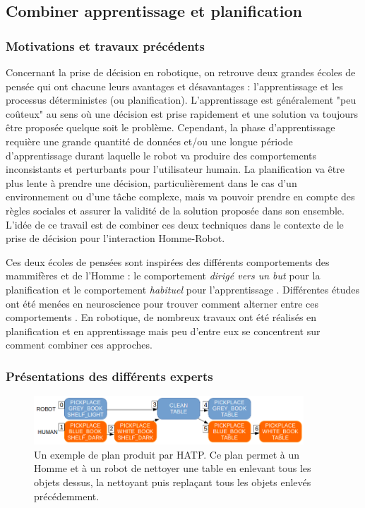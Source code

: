 \documentclass[english,a4paper,11pt,twoside]{StyleThese}
\begin{document}
\newpage
\subsection{Combiner apprentissage et planification}

\subsubsection{Motivations et travaux précédents}

Concernant la prise de décision en robotique, on retrouve deux grandes écoles de pensée qui ont chacune leurs avantages et désavantages : l'apprentissage et les processus déterministes (ou planification). L'apprentissage est généralement "peu coûteux" au sens où une décision est prise rapidement et une solution va toujours être proposée quelque soit le problème. Cependant, la phase d'apprentissage requière une grande quantité de données et/ou une longue période d'apprentissage durant laquelle le robot va produire des comportements inconsistants et perturbants pour l'utilisateur humain. La planification va être plus lente à prendre une décision, particulièrement dans le cas d'un environnement ou d'une tâche complexe, mais va pouvoir prendre en compte des règles sociales et assurer la validité de la solution proposée dans son ensemble. L'idée de ce travail est de combiner ces deux techniques dans le contexte de le prise de décision pour l’interaction Homme-Robot.

Ces deux écoles de pensées sont inspirées des différents comportements des mammifères et de l'Homme : le comportement \textit{dirigé vers un but} pour la planification et le comportement \textit{habituel} pour l'apprentissage \cite{dickinson1985actions}. Différentes études ont été menées en neuroscience pour trouver comment alterner entre ces comportements \cite{pezzulo2013mixed, lesaint2014modelling, viejo2015modeling}. En robotique, de nombreux travaux ont été réalisés en planification \cite{ingrand2014deliberation} et en apprentissage \cite{kober2011learning, martins2010learning, stulp2013robot} mais peu d'entre eux se concentrent sur comment combiner ces approches.


\subsubsection{Présentations des différents experts}

\begin{figure}[!h]
	\centering
    \includegraphics[width=0.9\textwidth]{figs/Chapter7/SharedPlan.png}
    \caption{Un exemple de plan produit par HATP. Ce plan permet à un Homme et à un robot de nettoyer une table en enlevant tous les objets dessus, la nettoyant puis replaçant tous les objets enlevés précédemment.}
    \label{fig:examplePlan}
\end{figure}
\end{document}
